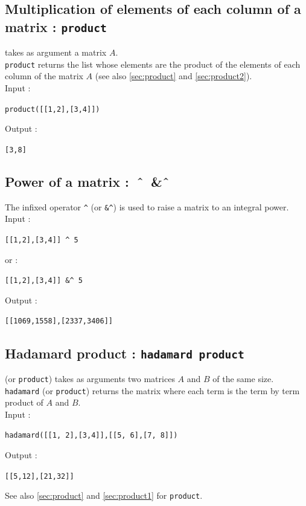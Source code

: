 \documentclass[a4paper,11pt]{book}
\begin{document}
\subsection{Multiplication of elements of each column of a matrix : {\tt product}}\label{sec:product1}
 takes as argument a matrix $A$.\\
{\tt product} returns the list whose elements are the product of the elements 
of each column of the matrix  $A$ (see also \ref{sec:product} and 
\ref{sec:product2}).\\
Input :
\begin{center}{\tt product([[1,2],[3,4]])}\end{center}
Output :
\begin{center}{\tt [3,8]}\end{center}

\subsection{Power of a matrix :\ \^\  \ \&\^\ }\index{\&\^\ }
The infixed operator {\tt \verb|^|} (or {\tt \&\verb|^|}) is used to 
raise a matrix to an integral power.\\
Input :
\begin{center}{\tt [[1,2],[3,4]] \verb|^| 5}\end{center}
or :
\begin{center}{\tt [[1,2],[3,4]] \&\verb|^| 5}\end{center}
Output :
\begin{center}{\tt [[1069,1558],[2337,3406]]}\end{center}

\subsection{Hadamard product : {\tt hadamard product}}\label{sec:product2}
 (or {\tt product}) takes as arguments two matrices $A$ 
and  $B$ of the same size.\\
{\tt hadamard} (or {\tt product}) returns the matrix where each term is the 
term by term product of $A$ and  $B$.\\ 
Input :
\begin{center}{\tt hadamard([[1, 2],[3,4]],[[5, 6],[7, 8]])}\end{center}
Output :
\begin{center}{\tt [[5,12],[21,32]]}\end{center}
See also \ref{sec:product} and \ref{sec:product1} for {\tt product}.
\end{document}
